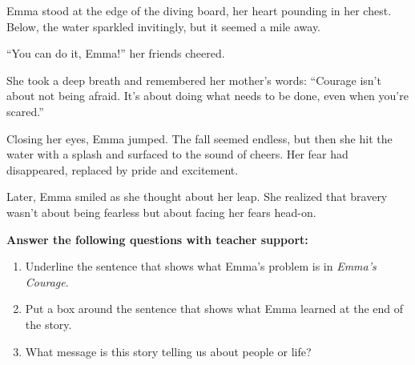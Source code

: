 \documentclass[12pt]{article}
\begin{document}
\begin{tcolorbox}[colframe=black!60, colback=white, 
coltitle=black, colbacktitle=black!15, fonttitle=\bfseries\Large, 
title=Guided Practice: \textit{Emma’s Courage}, halign title=center, left=10pt, right=10pt, top=10pt, bottom=15pt]

Emma stood at the edge of the diving board, her heart pounding in her chest. Below, the water sparkled invitingly, but it seemed a mile away. 

“You can do it, Emma!” her friends cheered. 

She took a deep breath and remembered her mother’s words: “Courage isn’t about not being afraid. It’s about doing what needs to be done, even when you’re scared.” 

Closing her eyes, Emma jumped. The fall seemed endless, but then she hit the water with a splash and surfaced to the sound of cheers. Her fear had disappeared, replaced by pride and excitement.

Later, Emma smiled as she thought about her leap. She realized that bravery wasn’t about being fearless but about facing her fears head-on. 

\textbf{Answer the following questions with teacher support:}
\begin{enumerate}[itemsep=1em]
    \item Underline the sentence that shows what Emma's problem is in \textit{Emma's Courage}.

    \item Put a box around the sentence that shows what Emma learned at the end of the story.
    \item What message is this story telling us about people or life?
\\[0.8cm] \underline{\hspace{15cm}}  
    \\[0.8cm] \underline{\hspace{15cm}}  
    \\[0.8cm] \underline{\hspace{15cm}} 


\end{enumerate}
\end{tcolorbox}
\end{document}

